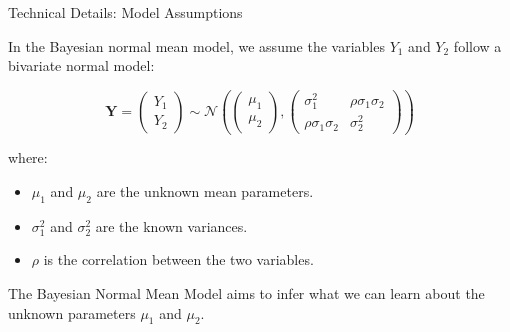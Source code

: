 \begin{frame}{Technical Details: Model Assumptions}

In the Bayesian normal mean model, we assume the variables $Y_1$ and $Y_2$ follow a bivariate normal model:

$$
\mathbf{Y} = 
\begin{pmatrix}
Y_1 \\
Y_2
\end{pmatrix}
\sim \mathcal{N}
\left( 
\begin{pmatrix}
\mu_1 \\
\mu_2
\end{pmatrix},
\begin{pmatrix}
\sigma_1^2 & \rho \sigma_1 \sigma_2 \\
\rho \sigma_1 \sigma_2 & \sigma_2^2
\end{pmatrix}
\right)
$$

where:

\begin{itemize}
\item $\mu_1$ and $\mu_2$ are the unknown mean parameters.
\item $\sigma_1^2$ and $\sigma_2^2$ are the known variances.
\item $\rho$ is the correlation between the two variables.
\end{itemize}

The Bayesian Normal Mean Model aims to infer what we can learn about the unknown parameters $\mu_1$ and $\mu_2$.

\end{frame}

